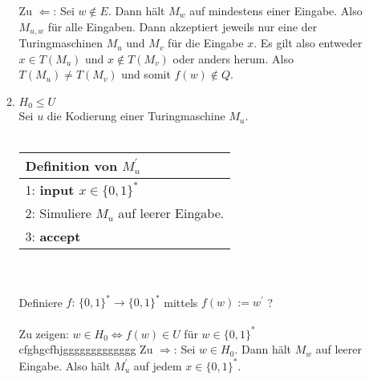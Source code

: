 \documentclass[12pt]{scrartcl}
\begin{document}
\begin{enumerate}
\begin{enumerate}
               Zu $\Leftarrow$: Sei $w \notin E$. Dann hält $M_w$ auf mindestens einer Eingabe. Also
               $M_{u,w}$ für alle Eingaben. Dann akzeptiert jeweils nur eine der Turingmaschinen $M_u$ und 
               $M_v$ für die Eingabe $x$. Es gilt also entweder $x \in T(M_u)$ und $x \notin T(M_v)$ oder anders herum.
               Also $T(M_u) \neq T(M_v)$ und somit $f(w) \notin Q$.
        \item $H_0 \leq U$\\
              Sei $u$ die Kodierung einer Turingmaschine $M_{u}$.\\\\
              \begin{tabular}[h!]{l}
                \hline
                Definition von $M_{u}^{'}$\\\hline
                1: \textbf{input $x \in \{0,1\}^*$}\\
                2: Simuliere $M_{u}$ auf leerer Eingabe.\\
                3: \textbf{accept}\\\hline
              \end{tabular}\\\\
              Definiere $f: \, \{0,1\}^* \rightarrow \{0,1\}^*$ mittels $f(w) := w^{'}$ ?\\\\
              Zu zeigen: $w \in H_0 \Longleftrightarrow f(w) \in U $ für $w \in \{0,1\}^*$\\
              cfghgcfhjggggggggggggg
              Zu $\Rightarrow$: Sei $w \in H_0$. Dann hält $M_{w}$ auf leerer Eingabe. Also hält $M_{u}^{'}$ auf jedem $x \in \{0,1\}^*$.
    \end{enumerate}
\end{enumerate}
\end{document}
